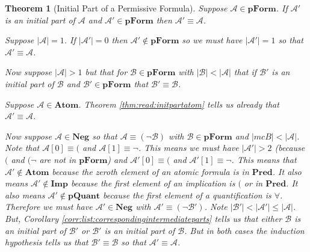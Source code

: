 \documentclass[12pt]{article}
\theoremstyle{break}
\theoremstyle{break}
\newtheorem{theorem}{Theorem}[section]
\theoremstyle{break}
\theoremstyle{break}
\theoremstyle{break}
\newtheorem{informal definition}[definition]{Informal Definition}
\newcommand{\mc}[1]{\mathcal{#1}}
\begin{document}
\begin{theorem}[Initial Part of a Permissive Formula]
\label{thm:read:pformnopropinitpart}
Suppose $\mc{A}\in\textbf{pForm}$.
If $\mc{A}'$ is an initial part of $\mc{A}$ and $\mc{A}'\in\textbf{pForm}$ then $\mc{A}'\equiv \mc{A}$.

Suppose $|\mc{A}| = 1$.
If $|\mc{A}'| = 0$ then $\mc{A}'\not \in \textbf{pForm}$ so we must have $|\mc{A}'| = 1$ so that $\mc{A}'\equiv \mc{A}$.

Now suppose $|\mc{A}|>1$ but that for $\mc{B}\in\textbf{pForm}$ with $|\mc{B}| < |\mc{A}|$ that if $\mc{B}'$ is an initial part of $\mc{B}$ and $\mc{B}' \in \textbf{pForm}$ that $\mc{B}'\equiv \mc{B}$.

Suppose $\mc{A}\in\textbf{Atom}$.
Theorem \ref{thm:read:initpartatom} tells us already that $\mc{A}'\equiv \mc{A}$.

Now suppose $\mc{A}\in\textbf{Neg}$ so that $\mc{A}\equiv (\lnot \mc{B})$ with $\mc{B}\in\textbf{pForm}$ and $|mc{B}|<|\mc{A}|$.
Note that $\mc{A}[0] \equiv ($ and $\mc{A}[1]\equiv \lnot$.
This means we must have $|\mc{A}'|>2$ (because $($ and $(\lnot$ are not in $\textbf{pForm}$) and $\mc{A}'[0]\equiv ($ and $\mc{A}'[1]\equiv \lnot$.
This means that $\mc{A}'\not \in \textbf{Atom}$ because the zeroth element of an atomic formula is in $\textbf{Pred}$.
It also means $\mc{A}'\not\in \textbf{Imp}$ because the first element of an implication is $($ or in $\textbf{Pred}$.
It also means $\mc{A}' \not \in \textbf{pQuant}$ because the first element of a quantification is $\forall$.
Therefore we must have $\mc{A}'\in\textbf{Neg}$ with $\mc{A}'\equiv (\lnot \mc{B}')$.
Note $|\mc{B}'|<|\mc{A}'|\le |\mc{A}|$.
But, Corollary \ref{corr:list:correspondingintermediateparts} tells us that either $\mc{B}$ is an initial part of $\mc{B}'$ or $\mc{B}'$ is an initial part of $\mc{B}$.
But in both cases the induction hypothesis tells us that $\mc{B}'\equiv \mc{B}$ so that $\mc{A}'\equiv \mc{A}$.


\end{theorem}
\end{document}
